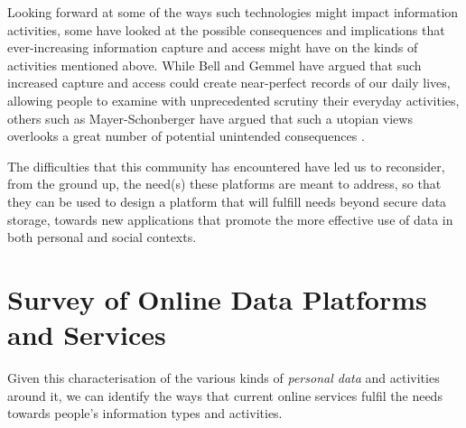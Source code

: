 \documentclass[graybox]{svmult}
\begin{document}

Looking forward at some of the ways such technologies might impact information activities, some have looked at the possible consequences and implications that ever-increasing information capture and access might have on the kinds of activities mentioned above.  While Bell and Gemmel have argued \cite{bell2010total} that such increased capture and access could create near-perfect records of our daily lives, allowing people to examine with unprecedented scrutiny their everyday activities, others such as Mayer-Schonberger have argued that such a utopian views overlooks a great number of potential unintended consequences \cite{mayer-schonberger2013}.   


The difficulties that this community has encountered have led us to reconsider, from the ground up, the need(s) these platforms are meant to address, so that they can be used to design a platform that will fulfill needs beyond secure data storage, towards new applications that promote the more effective use of data in both personal and social contexts.

\section{Survey of Online Data Platforms and Services}

Given this characterisation of the various kinds of \emph{personal data} and activities around it, we can identify the ways that current online services fulfil the needs towards people's information types and activities.  
\end{document}
